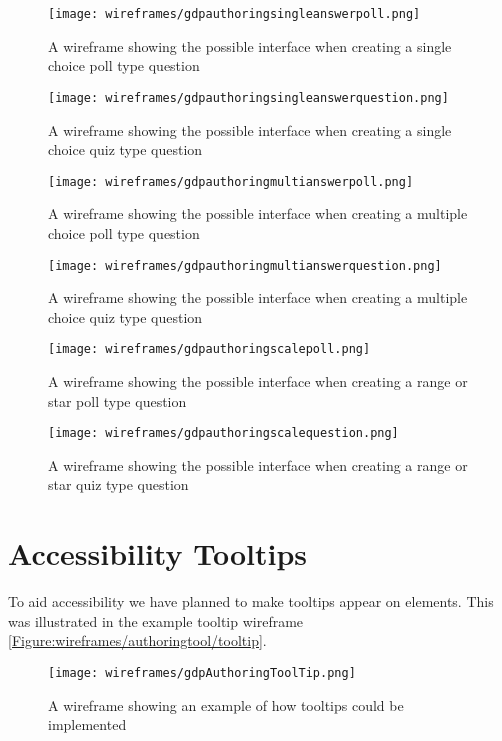 \begin{figure}
	\centering
	\texttt{[image: wireframes/gdpauthoringsingleanswerpoll.png]}
	\caption{A wireframe showing the possible interface when creating a single choice poll type question}
	\label{Figure:wireframes/authoringtool/singlePoll}
\end{figure}

\begin{figure}
	\centering
	\texttt{[image: wireframes/gdpauthoringsingleanswerquestion.png]}
	\caption{A wireframe showing the possible interface when creating a single choice quiz type question}
	\label{Figure:wireframes/authoringtool/singleQuiz}
\end{figure}

\begin{figure}
	\centering
	\texttt{[image: wireframes/gdpauthoringmultianswerpoll.png]}
	\caption{A wireframe showing the possible interface when creating a multiple choice poll type question}
	\label{Figure:wireframes/authoringtool/multiPoll}
\end{figure}

\begin{figure}
	\centering
	\texttt{[image: wireframes/gdpauthoringmultianswerquestion.png]}
	\caption{A wireframe showing the possible interface when creating a multiple choice quiz type question}
	\label{Figure:wireframes/authoringtool/multiQuiz}
\end{figure}

\begin{figure}
	\centering
	\texttt{[image: wireframes/gdpauthoringscalepoll.png]}
	\caption{A wireframe showing the possible interface when creating a range or star poll type question}
	\label{Figure:wireframes/authoringtool/rangeStarPoll}
\end{figure}


\begin{figure}
	\centering
	\texttt{[image: wireframes/gdpauthoringscalequestion.png]}
	\caption{A wireframe showing the possible interface when creating a range or star quiz type question}
	\label{Figure:wireframes/authoringtool/rangeStarQuiz}
\end{figure}

\section{Accessibility Tooltips}

To aid accessibility we have planned to make tooltips appear on elements. This was illustrated in the example tooltip wireframe \autoref{Figure:wireframes/authoringtool/tooltip}.

\begin{landscape}
\begin{figure}
	\centering
	\texttt{[image: wireframes/gdpAuthoringToolTip.png]}
	\caption{A wireframe showing an example of how tooltips could be implemented}
	\label{Figure:wireframes/authoringtool/tooltip}
\end{figure}
\end{landscape}